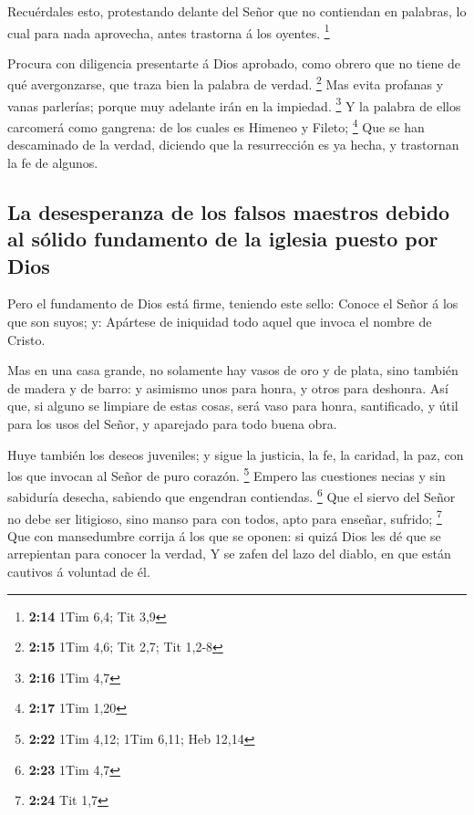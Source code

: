  Recuérdales esto, protestando delante del Señor que no
contiendan en palabras, lo cual para nada aprovecha, antes trastorna á
los oyentes. \footnote{\textbf{2:14} 1Tim 6,4; Tit 3,9}

 Procura con diligencia presentarte á Dios aprobado, como
obrero que no tiene de qué avergonzarse, que traza bien la palabra de
verdad. \footnote{\textbf{2:15} 1Tim 4,6; Tit 2,7; Tit 1,2-8}
 Mas evita profanas y vanas parlerías; porque muy adelante
irán en la impiedad. \footnote{\textbf{2:16} 1Tim 4,7}  Y
la palabra de ellos carcomerá como gangrena: de los cuales es Himeneo y
Fileto; \footnote{\textbf{2:17} 1Tim 1,20}  Que se han
descaminado de la verdad, diciendo que la resurrección es ya hecha, y
trastornan la fe de algunos.

\hypertarget{la-desesperanza-de-los-falsos-maestros-debido-al-suxf3lido-fundamento-de-la-iglesia-puesto-por-dios}{%
\subsection{La desesperanza de los falsos maestros debido al sólido
fundamento de la iglesia puesto por
Dios}\label{la-desesperanza-de-los-falsos-maestros-debido-al-suxf3lido-fundamento-de-la-iglesia-puesto-por-dios}}

 Pero el fundamento de Dios está firme, teniendo este
sello: Conoce el Señor á los que son suyos; y: Apártese de iniquidad
todo aquel que invoca el nombre de Cristo.

 Mas en una casa grande, no solamente hay vasos de oro y de
plata, sino también de madera y de barro: y asimismo unos para honra, y
otros para deshonra.  Así que, si alguno se limpiare de
estas cosas, será vaso para honra, santificado, y útil para los usos del
Señor, y aparejado para todo buena obra.

 Huye también los deseos juveniles; y sigue la justicia, la
fe, la caridad, la paz, con los que invocan al Señor de puro corazón.
\footnote{\textbf{2:22} 1Tim 4,12; 1Tim 6,11; Heb 12,14} 
Empero las cuestiones necias y sin sabiduría desecha, sabiendo que
engendran contiendas. \footnote{\textbf{2:23} 1Tim 4,7} 
Que el siervo del Señor no debe ser litigioso, sino manso para con
todos, apto para enseñar, sufrido; \footnote{\textbf{2:24} Tit 1,7}
 Que con mansedumbre corrija á los que se oponen: si quizá
Dios les dé que se arrepientan para conocer la verdad,  Y
se zafen del lazo del diablo, en que están cautivos á voluntad de él.

